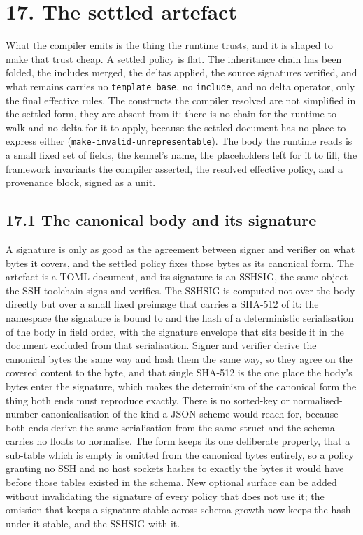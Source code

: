 \hypertarget{the-settled-artefact}{%
\chapter{17. The settled artefact}\label{the-settled-artefact}}

What the compiler emits is the thing the runtime trusts, and it is
shaped to make that trust cheap. A settled policy is flat. The
inheritance chain has been folded, the includes merged, the deltas
applied, the source signatures verified, and what remains carries no
\texttt{template\_base}, no \texttt{include}, and no delta operator,
only the final effective rules. The constructs the compiler resolved are
not simplified in the settled form, they are absent from it: there is no
chain for the runtime to walk and no delta for it to apply, because the
settled document has no place to express either
(\texttt{make-invalid-unrepresentable}). The body the runtime reads is a
small fixed set of fields, the kennel's name, the placeholders left for
it to fill, the framework invariants the compiler asserted, the resolved
effective policy, and a provenance block, signed as a unit.

\hypertarget{the-canonical-body-and-its-signature}{%
\section{17.1 The canonical body and its
signature}\label{the-canonical-body-and-its-signature}}

A signature is only as good as the agreement between signer and verifier
on what bytes it covers, and the settled policy fixes those bytes as its
canonical form. The artefact is a TOML document, and its signature is an
SSHSIG, the same object the SSH toolchain signs and verifies. The SSHSIG
is computed not over the body directly but over a small fixed preimage
that carries a SHA-512 of it: the namespace the signature is bound to
and the hash of a deterministic serialisation of the body in field
order, with the signature envelope that sits beside it in the document
excluded from that serialisation. Signer and verifier derive the
canonical bytes the same way and hash them the same way, so they agree
on the covered content to the byte, and that single SHA-512 is the one
place the body's bytes enter the signature, which makes the determinism
of the canonical form the thing both ends must reproduce exactly. There
is no sorted-key or normalised-number canonicalisation of the kind a
JSON scheme would reach for, because both ends derive the same
serialisation from the same struct and the schema carries no floats to
normalise. The form keeps its one deliberate property, that a sub-table
which is empty is omitted from the canonical bytes entirely, so a policy
granting no SSH and no host sockets hashes to exactly the bytes it would
have before those tables existed in the schema. New optional surface can
be added without invalidating the signature of every policy that does
not use it; the omission that keeps a signature stable across schema
growth now keeps the hash under it stable, and the SSHSIG with it.

